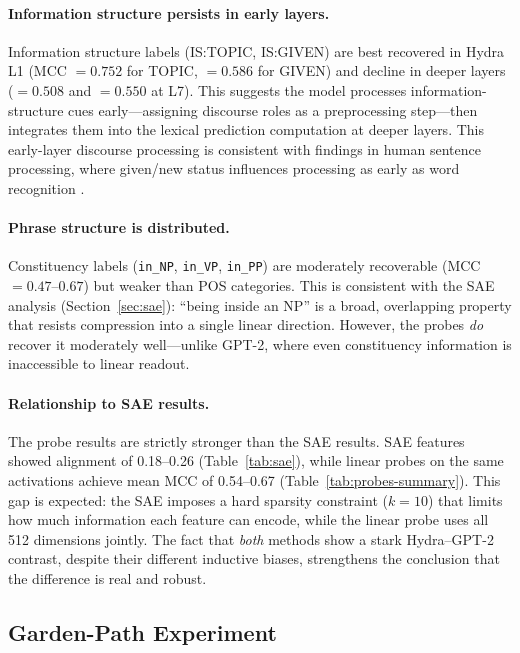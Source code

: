\documentclass[11pt]{article}
\begin{document}
\paragraph{Information structure persists in early layers.}
Information structure labels (IS:TOPIC, IS:GIVEN) are best recovered in 
Hydra L1 (MCC $= 0.752$ for TOPIC, $= 0.586$ for GIVEN) and decline in 
deeper layers ($= 0.508$ and $= 0.550$ at L7). This suggests the model 
processes information-structure cues early---assigning discourse roles 
as a preprocessing step---then integrates them into the lexical prediction 
computation at deeper layers. This early-layer discourse processing is 
consistent with findings in human sentence processing, where given/new 
status influences processing as early as word recognition 
\cite{brown1983discourse}.

\paragraph{Phrase structure is distributed.}
Constituency labels (\texttt{in\_NP}, \texttt{in\_VP}, \texttt{in\_PP}) 
are moderately recoverable (MCC $= 0.47$--$0.67$) but weaker than POS 
categories. This is consistent with the SAE analysis (Section~\ref{sec:sae}): 
``being inside an NP'' is a broad, overlapping property that resists 
compression into a single linear direction. However, the probes \emph{do} 
recover it moderately well---unlike GPT-2, where even constituency 
information is inaccessible to linear readout.

\paragraph{Relationship to SAE results.}
The probe results are strictly stronger than the SAE results. SAE features 
showed alignment of 0.18--0.26 (Table~\ref{tab:sae}), while linear probes 
on the same activations achieve mean MCC of 0.54--0.67 
(Table~\ref{tab:probes-summary}). This gap is expected: the SAE imposes a 
hard sparsity constraint ($k=10$) that limits how much information each 
feature can encode, while the linear probe uses all 512 dimensions jointly. 
The fact that \emph{both} methods show a stark Hydra--GPT-2 contrast, despite 
their different inductive biases, strengthens the conclusion that the 
difference is real and robust.

\subsection{Garden-Path Experiment}
\label{sec:gardenpath}
\end{document}
